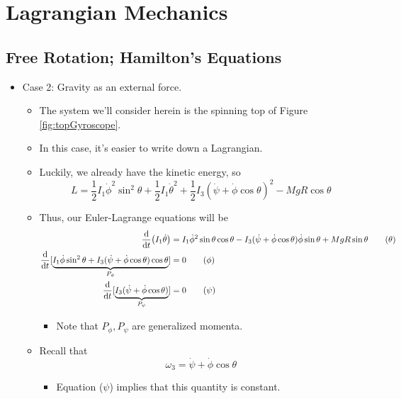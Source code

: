 \documentclass[../notes.tex]{subfiles}
\begin{document}
\chapter{Lagrangian Mechanics}
\section{Free Rotation; Hamilton's Equations}
\begin{itemize}
    \item {}Case 2: Gravity as an external force.
    \begin{itemize}
        \item The system we'll consider herein is the spinning top of Figure \ref{fig:topGyroscope}.
        \item In this case, it's easier to write down a Lagrangian.
        \item Luckily, we already have the kinetic energy, so
        \begin{equation*}
            L = \frac{1}{2}I_1\dot{\phi}^2\sin^2\theta+\frac{1}{2}I_1\dot{\theta}^2+\frac{1}{2}I_3(\dot{\psi}+\dot{\phi}\cos\theta)^2-MgR\cos\theta
        \end{equation*}
        \item Thus, our Euler-Lagrange equations will be
        \begin{align*}
            \dv{t}(I_1\dot{\theta}) &= I_1\dot{\phi}^2\sin\theta\cos\theta-I_3(\dot{\psi}+\dot{\phi}\cos\theta)\dot{\phi}\sin\theta+MgR\sin\theta\tag{$\theta$}\\
            \dv{t}[\underbrace{I_1\dot{\phi}\sin^2\theta+I_3(\dot{\psi}+\dot{\phi}\cos\theta)\cos\theta}_{P_\phi}] &= 0\tag{$\phi$}\\
            \dv{t}[\underbrace{I_3(\dot{\psi}+\dot{\phi}\cos\theta)}_{P_\psi}] &= 0\tag{$\psi$}
        \end{align*}
        \begin{itemize}
            \item Note that $P_\phi,P_\psi$ are generalized momenta.
        \end{itemize}
        \item Recall that
        \begin{equation*}
            \omega_3 = \dot{\psi}+\dot{\phi}\cos\theta
        \end{equation*}
        \begin{itemize}
            \item Equation ($\psi$) implies that this quantity is constant.

\end{itemize}
\end{itemize}
\end{itemize}
\end{document}
